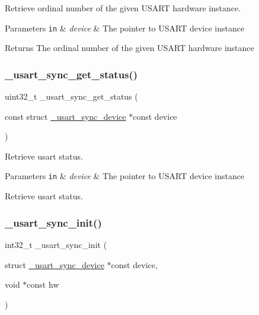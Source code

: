 Retrieve ordinal number of the given U\+S\+A\+RT hardware instance. 


\begin{DoxyParams}[1]{Parameters}
\mbox{\tt in}  & {\em device} & The pointer to U\+S\+A\+RT device instance\\
\hline
\end{DoxyParams}
\begin{DoxyReturn}{Returns}
The ordinal number of the given U\+S\+A\+RT hardware instance 
\end{DoxyReturn}
\mbox{\label{group___h_p_l_ga512c769b924d59433542bf347980334b}} 
\subsubsection{\texorpdfstring{\+\_\+usart\+\_\+sync\+\_\+get\+\_\+status()}{\_usart\_sync\_get\_status()}}
{\footnotesize\ttfamily uint32\+\_\+t \+\_\+usart\+\_\+sync\+\_\+get\+\_\+status (\begin{DoxyParamCaption}\item[{const struct \hyperlink{struct__usart__sync__device}{\+\_\+usart\+\_\+sync\+\_\+device} $\ast$const}]{device }\end{DoxyParamCaption})}



Retrieve usart status. 


\begin{DoxyParams}[1]{Parameters}
\mbox{\tt in}  & {\em device} & The pointer to U\+S\+A\+RT device instance\\
\hline
\end{DoxyParams}
Retrieve usart status. \mbox{\label{group___h_p_l_gad1cc7b8e72fd67fdeec8062c802eb25a}} 
\subsubsection{\texorpdfstring{\+\_\+usart\+\_\+sync\+\_\+init()}{\_usart\_sync\_init()}}
{\footnotesize\ttfamily int32\+\_\+t \+\_\+usart\+\_\+sync\+\_\+init (\begin{DoxyParamCaption}\item[{struct \hyperlink{struct__usart__sync__device}{\+\_\+usart\+\_\+sync\+\_\+device} $\ast$const}]{device,  }\item[{void $\ast$const}]{hw }\end{DoxyParamCaption})}




